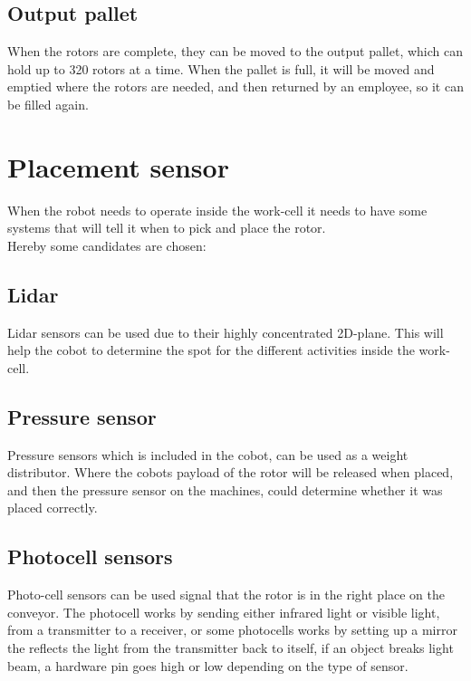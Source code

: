  \subsection{Output pallet}
 When the rotors are complete, they can be moved to the output pallet, which can hold up to 320 rotors at a time. When the pallet is full, it will be moved and emptied where the rotors are needed, and then returned by an employee, so it can be filled again.\\ 
 
 \section{Placement sensor}\label{ref:PlacementS}
 
 When the robot needs to operate inside the work-cell it needs to have some systems that will tell it when to pick and place the rotor.\\
 Hereby some candidates are chosen:\\

 
  \subsection{Lidar} 
  Lidar sensors can be used due to their highly concentrated 2D-plane. This will help the cobot to determine the spot for the different activities inside the work-cell\cite{Lidar}.\\

  \subsection{Pressure sensor}
  Pressure sensors which is included in the cobot, can be used as a weight distributor. Where the cobots payload of the rotor will be released when placed, and then the pressure sensor on the machines, could determine whether it was placed correctly.\\
 
  \subsection{Photocell sensors} 
  Photo-cell sensors can be used signal that the rotor is in the right place on the conveyor. The photocell works by sending either infrared light or visible light, from a transmitter to a receiver, or some photocells works by setting up a mirror the reflects the light from the transmitter back to itself, if an object breaks light beam, a hardware pin goes high or low depending on the type of sensor\cite{SICKfo}. \\

